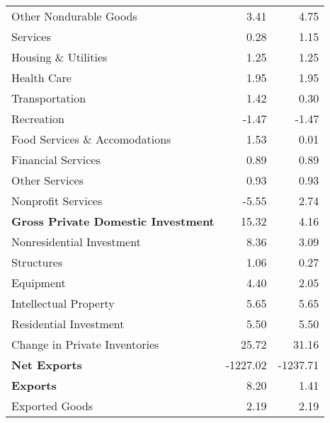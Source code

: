 \documentclass[11pt, letterpaper]{article}\usepackage[]{graphicx}\usepackage[]{color}
\begin{document}
\begin{table}[H]
\begin{tabular}{lrr}
  \hspace{24mm}  Other Nondurable Goods & 3.41 & 4.75 \\ 
  \hspace{8mm}  Services & 0.28 & 1.15 \\ 
  \hspace{16mm}  Housing \& Utilities & 1.25 & 1.25 \\ 
  \hspace{16mm}  Health Care & 1.95 & 1.95 \\ 
  \hspace{16mm}  Transportation & 1.42 & 0.30 \\ 
  \hspace{16mm}  Recreation & -1.47 & -1.47 \\ 
  \hspace{16mm}  Food Services \& Accomodations & 1.53 & 0.01 \\ 
  \hspace{16mm}  Financial Services & 0.89 & 0.89 \\ 
  \hspace{16mm}  Other Services & 0.93 & 0.93 \\ 
  \hspace{16mm}  Nonprofit Services & -5.55 & 2.74 \\ 
  \hspace{0mm} \textbf{Gross Private Domestic Investment} & 15.32 & 4.16 \\ 
  \hspace{8mm}  Nonresidential Investment & 8.36 & 3.09 \\ 
  \hspace{16mm}  Structures & 1.06 & 0.27 \\ 
  \hspace{16mm}  Equipment & 4.40 & 2.05 \\ 
  \hspace{16mm}  Intellectual Property & 5.65 & 5.65 \\ 
  \hspace{8mm}  Residential Investment & 5.50 & 5.50 \\ 
  \hspace{8mm}  Change in Private Inventories & 25.72 & 31.16 \\ 
  \hspace{0mm} \textbf{Net Exports} & -1227.02 & -1237.71 \\ 
  \hspace{0mm} \textbf{Exports} & 8.20 & 1.41 \\ 
  \hspace{8mm}  Exported Goods & 2.19 & 2.19 \\ 

\end{tabular}
\end{table}
\end{document}
